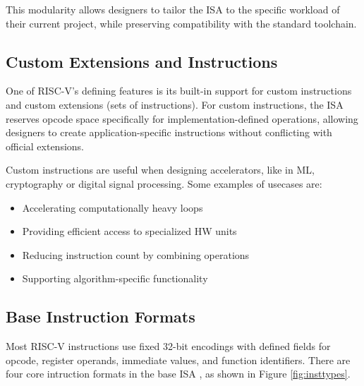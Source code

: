 This modularity allows designers to tailor the ISA to the specific workload of their current project, while preserving compatibility with the standard toolchain.

\subsection{Custom Extensions and Instructions}
One of RISC-V’s defining features is its built-in support for custom instructions and custom extensions (sets of instructions). For custom instructions, the ISA reserves opcode space specifically for implementation-defined operations, allowing designers to create application-specific instructions without conflicting with official extensions.

Custom instructions are useful when designing accelerators, like in ML, cryptography or digital signal processing. Some examples of usecases are:

\begin{itemize}
    \item Accelerating computationally heavy loops
    \item Providing efficient access to specialized HW units
    \item Reducing instruction count by combining operations
    \item Supporting algorithm-specific functionality
\end{itemize}

\subsection{Base Instruction Formats}
\label{sec:instform}
Most RISC-V instructions use fixed 32-bit encodings with defined fields for opcode, register operands, immediate values, and function identifiers. There are four core intruction formats in the base ISA \cite{WatermanLee2011}, as shown in Figure \ref{fig:insttypes}.


